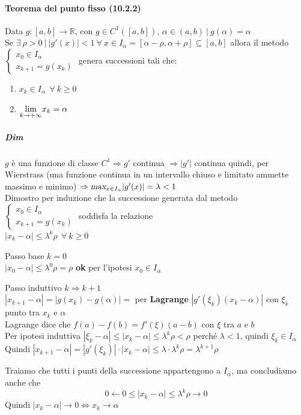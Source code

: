 \documentclass[10pt]{book}
\begin{document}
\paragraph{Teorema del punto fisso (10.2.2)} Data $g : [a, b] \rightarrow\mathbb{R}$, con $g \in C^1([a, b])$, $\alpha \in (a, b)\:|\:g(\alpha) = \alpha$\\
Se $\exists\:\rho>0\:|\:|g'(x)|<1\:\forall\:x\in I_\alpha = [\alpha - \rho, \alpha + \rho]\subseteq[a, b]$  allora il metodo $\left\{\begin{array}{l}
x_0 \in I_\alpha\\
x_{k+1} = g(x_k)
\end{array}\right.$ genera successioni tali che:
\begin{enumerate}
	\item $x_k \in I_\alpha\:\:\forall\:k\geq 0$
	\item $\mathlarger{\lim_{k\to+\infty}}x_k = \alpha$
\end{enumerate}
\subparagraph{Dim} $g$ è una funzione di classe $C^1 \Rightarrow g'$ continua $\Rightarrow |g'|$ continua quindi, per Wierstrass (una funzione continua in un intervallo chiuso e limitato ammette massimo e minimo) $\Rightarrow \mathlarger{\textsl{max}_{x\in I_\alpha}}|g'(x)| = \lambda < 1$\\
Dimostro per induzione che la successione generata dal metodo $\left\{\begin{array}{l}
x_0 \in I_\alpha\\
x_{k+1} = g(x_k)
\end{array}\right.$ soddisfa la relazione\\$|x_k - \alpha| \leq \lambda^k\rho\:\:\forall\:k\geq 0$
\begin{list}{}{}
	\item Passo base $k = 0$\\
	$|x_0 - \alpha| \leq \lambda^0\rho = \rho$ \textbf{ok} per l'ipotesi $x_0 \in I_\alpha$
	\item Passo induttivo $k \Rightarrow k+1$\\
	$|x_{k+1} - \alpha| = |g(x_k) - g(\alpha)| =$ per \textbf{Lagrange} $|g'(\xi_k)(x_k - \alpha)|$ con $\xi_k$ punto tra $x_k$ e $\alpha$\\
	Lagrange dice che $f(a) - f(b) = f'(\xi)(a - b)$ con $\xi$ tra $a$ e $b$\\
	Per ipotesi induttiva $|\xi_k - \alpha| \leq |x_k - \alpha| \leq \lambda^k\rho < \rho$ perché $\lambda < 1$, quindi $\xi_k \in I_\alpha$\\
	Quindi $|x_{k+1} - \alpha| = |g'(\xi_k)|\cdot|x_k - \alpha| \leq \lambda\cdot\lambda^k\rho = \lambda^{k+1}\rho$
\end{list}
Traiamo che tutti i punti della successione appartengono a $I_\alpha$, ma concludiamo anche che $$0 \longleftarrow 0 \leq |x_k - \alpha| \leq \lambda^k\rho \longrightarrow 0$$
Quindi $|x_k - \alpha| \rightarrow 0 \Leftrightarrow x_k \rightarrow \alpha$
\end{document}
